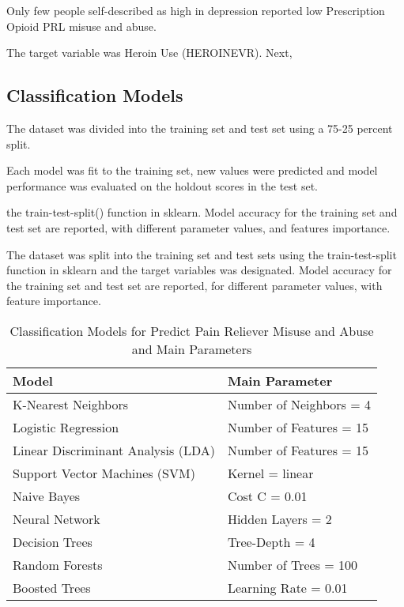 \documentclass[sigconf]{acmart}
\begin{document}
Only few people 
self-described as high in depression reported low Prescription Opioid PRL 
misuse and abuse. 

 The target variable was Heroin Use (HEROINEVR). Next, 


\subsection{Classification Models}

The dataset was divided into the training set and test set using a 75-25 
percent split. 


Each model was fit to the training set, new values were predicted and model 
performance was evaluated on the holdout scores in the test set. 

the train-test-split() function in sklearn. Model accuracy for the training 
set and test 
set are reported, with different parameter values, and features importance. 


The dataset was split into the training set and test 
sets using the train-test-split function in sklearn and the target variables 
was designated. Model accuracy for the training set and test set are reported, 
for different parameter values, with feature importance. 

\begin{table}
  \caption{Classification Models for Predict Pain Reliever Misuse 
  and Abuse and Main Parameters}
  \label{tab:freq}
  \begin{tabular}{ll}
    \toprule
    Model & Main Parameter \\
    \midrule
    K-Nearest Neighbors & Number of Neighbors = 4 \\
    Logistic Regression & Number of Features = 15 \\
    Linear Discriminant Analysis (LDA) & Number of Features = 15 \\
    Support Vector Machines (SVM) & Kernel = linear \\
    Naive Bayes & Cost C = 0.01 \\
    Neural Network & Hidden Layers = 2 \\
    Decision Trees & Tree-Depth = 4 \\ 
    Random Forests & Number of Trees = 100 \\
    Boosted Trees & Learning Rate = 0.01 \\ 
    \bottomrule
  \end{tabular}
\end{table}
\end{document}
